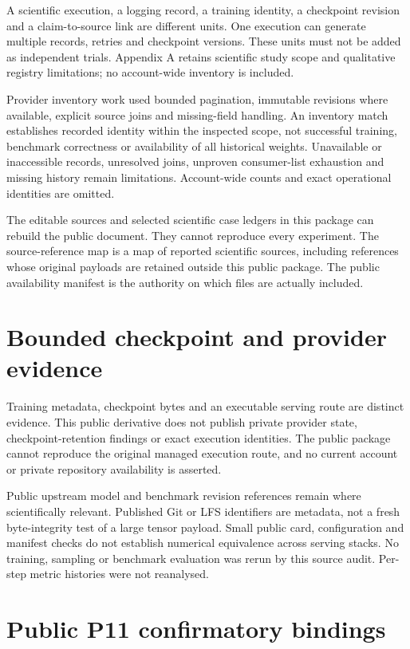\documentclass[12pt,a4paper]{report}
\begin{document}
A scientific execution, a logging record, a training identity, a
checkpoint revision and a claim-to-source link are different units. One
execution can generate multiple records, retries and checkpoint
versions. These units must not be added as independent trials. Appendix
A retains scientific study scope and qualitative registry limitations;
no account-wide inventory is included.

Provider inventory work used bounded pagination, immutable revisions
where available, explicit source joins and missing-field handling. An
inventory match establishes recorded identity within the inspected
scope, not successful training, benchmark correctness or availability of
all historical weights. Unavailable or inaccessible records, unresolved
joins, unproven consumer-list exhaustion and missing history remain
limitations. Account-wide counts and exact operational identities are
omitted.

The editable sources and selected scientific case ledgers in this
package can rebuild the public document. They cannot reproduce every
experiment. The source-reference map is a map of reported scientific
sources, including references whose original payloads are retained
outside this public package. The public availability manifest is the
authority on which files are actually included.

\section{Bounded checkpoint and provider
evidence}\label{bounded-checkpoint-and-provider-evidence}

Training metadata, checkpoint bytes and an executable serving route are
distinct evidence. This public derivative does not publish private
provider state, checkpoint-retention findings or exact execution
identities. The public package cannot reproduce the original managed
execution route, and no current account or private repository
availability is asserted.

Public upstream model and benchmark revision references remain where
scientifically relevant. Published Git or LFS identifiers are metadata,
not a fresh byte-integrity test of a large tensor payload. Small public
card, configuration and manifest checks do not establish numerical
equivalence across serving stacks. No training, sampling or benchmark
evaluation was rerun by this source audit. Per-step metric histories
were not reanalysed.

\section{Public P11 confirmatory
bindings}\label{public-p11-confirmatory-bindings}
\end{document}
